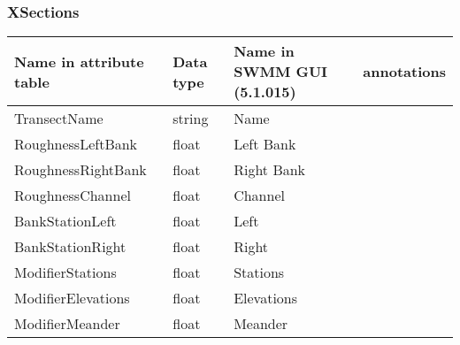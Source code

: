 \documentclass[10pt,a4paper,oneside]{scrbook}
\begin{document}
\subsubsection{XSections}
\begin{tabular}{p{4cm}|p{1.3cm}|P{3cm}|P{5.7cm}}
\hline 
\textbf{Name in attribute table} & \textbf{Data type} & \textbf{Name in SWMM GUI (5.1.015)} & \textbf{annotations}\\ 
\hline 
TransectName & string & Name & \\
RoughnessLeftBank & float & Left Bank & \\ 
RoughnessRightBank & float & Right Bank & \\ 
RoughnessChannel & float & Channel & \\ 
BankStationLeft & float & Left& \\  
BankStationRight& float & Right & \\ 
ModifierStations & float & Stations & \\ 
ModifierElevations& float & Elevations & \\ 
ModifierMeander& float & Meander & \\ 
\hline
\end{tabular}
					
					
\printbibliography %
\end{document}
